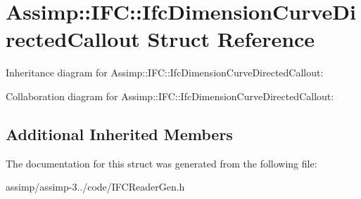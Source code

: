 \hypertarget{struct_assimp_1_1_i_f_c_1_1_ifc_dimension_curve_directed_callout}{\section{Assimp\+:\+:I\+F\+C\+:\+:Ifc\+Dimension\+Curve\+Directed\+Callout Struct Reference}
\label{struct_assimp_1_1_i_f_c_1_1_ifc_dimension_curve_directed_callout}
}


Inheritance diagram for Assimp\+:\+:I\+F\+C\+:\+:Ifc\+Dimension\+Curve\+Directed\+Callout\+:


Collaboration diagram for Assimp\+:\+:I\+F\+C\+:\+:Ifc\+Dimension\+Curve\+Directed\+Callout\+:
\subsection*{Additional Inherited Members}


The documentation for this struct was generated from the following file\+:\begin{DoxyCompactItemize}
\item 
assimp/assimp-\/3../code/I\+F\+C\+Reader\+Gen.\+h\end{DoxyCompactItemize}
